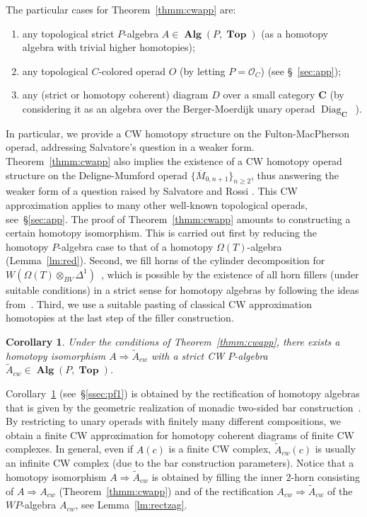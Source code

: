 \documentclass{amsart}
\newcounter{thmMaincounter}
\newtheorem{corollaryM}[thmMaincounter]{Corollary}
\theoremstyle{definition}
\theoremstyle{remark}
\newcommand{\Cc}{\mathbf{C}}
\DeclareMathOperator{\Top}{\mathbf{Top}}
\DeclareMathOperator{\Alg}{\mathbf{Alg}}
\DeclareMathOperator{\Diag}{Diag}
\begin{document}
	
	The particular cases for Theorem~\ref{thmm:cwapp} are:
	\begin{enumerate}[label=(\roman*)]
		\item any topological strict $P$-algebra $A\in\Alg(P,\Top)$ (as a homotopy algebra with trivial higher homotopies);
		\item any topological $C$-colored operad $O$ (by letting $P=\mathcal{O}_{C}$) (see \S~\ref{sec:app});
		\item any (strict or homotopy coherent) diagram $D$ over a small category $\Cc$ (by considering it as an algebra over the Berger-Moerdijk unary operad $\Diag_{\Cc}$~\cite{be-mo-06}).
	\end{enumerate}
	In particular, we provide a CW homotopy structure on the Fulton-MacPherson operad, addressing Salvatore's question \cite[p.449]{sa-22} 
	in a weaker form.
	Theorem~\ref{thmm:cwapp} also implies the existence of a CW homotopy operad structure on the Deligne-Mumford operad $\{ \overline{M}_{0,n+1} \}_{n \geqslant 2}$, thus answering the weaker form of a question raised by Salvatore and Rossi \cite[\S1.1 (1)]{rossi-sa24}.
	This CW approximation applies to many other well-known topological operads, see~\S\ref{sec:app}.
	The proof of Theorem~\ref{thmm:cwapp} amounts to constructing a certain homotopy isomorphism. 
	This is carried out first by reducing the homotopy $P$-algebra case to that of a homotopy $\Omega(T)$-algebra (Lemma~\ref{lm:red}).
	Second, we fill horns of the cylinder decomposition for $W(\Omega(T)\otimes_{BV}\Delta^{1})$~\cite{ci-mo-11}, which is possible by the existence of all horn fillers (under suitable conditions) in a strict sense for homotopy algebras by following the ideas from~\cite{co-po-86}.
	Third, we use a suitable pasting of classical CW approximation homotopies at the last step of the filler construction.
	
	\begin{corollaryM}\label{corm:rect}
		Under the conditions of Theorem~\ref{thmm:cwapp}, there exists a homotopy isomorphism $A\Rightarrow \widetilde{A}_{cw}$ with a strict CW $P$-algebra $\widetilde{A}_{cw}\in \Alg(P,\Top)$.
	\end{corollaryM}
	
	Corollary~\ref{corm:rect} (see~\S\ref{ssec:pf1}) is obtained by the rectification of homotopy algebras that is given by the geometric realization of monadic two-sided bar construction~\cite{be-mo-06'}.
	By restricting to unary operads with finitely many different compositions, we obtain a finite CW approximation for homotopy coherent diagrams of finite CW complexes.
	In general, even if $A(c)$ is a finite CW complex, $\widetilde{A}_{cw}(c)$ is usually an infinite CW complex (due to the bar construction parameters).
	Notice that a homotopy isomorphism $A\Rightarrow \widetilde{A}_{cw}$ is obtained by filling the inner $2$-horn consisting of $A\Rightarrow A_{cw}$ (Theorem~\ref{thmm:cwapp}) and of the rectification $A_{cw}\Rightarrow \widetilde{A}_{cw}$ of the $WP$-algebra $A_{cw}$, see Lemma~\ref{lm:rectzag}. 
	
\end{document}
